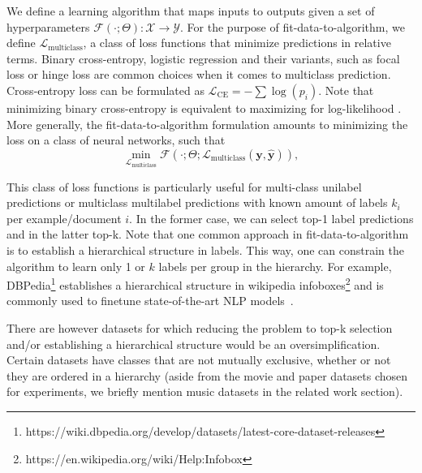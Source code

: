 We define a learning algorithm that maps inputs to outputs given a set of hyperparameters \(\mathcal{F}(\cdot ; \Theta): \mathcal{X} \rightarrow \mathcal{Y}\). For the purpose of fit-data-to-algorithm,
we define \(\mathcal{L}_{\text {multiclass}}\), a class of loss functions that
minimize predictions in relative terms. Binary cross-entropy, logistic regression and their
variants, such as focal loss or hinge loss are common choices when it comes to
multiclass prediction. Cross-entropy loss can be formulated as
\(\mathcal{L}_{\text {CE}}=-\sum \log \left(p_{i}\right)\). Note that
minimizing binary cross-entropy is equivalent to maximizing for log-likelihood
\cite[Section 4.3.4]{Bishop}. More generally, the fit-data-to-algorithm formulation amounts to minimizing the loss on a class of neural networks, such that
%
\begin{equation}
\underset{\mathcal{L}_{\text {multiclass}}} {\min} \mathcal{F}\left(\cdot ;
\Theta; \mathcal{L}_{\text {multiclass}} (\mathbf{y}, \hat{\mathbf{y}})
\right),
\end{equation}
%

This class of loss functions is particularly useful for multi-class unilabel predictions or multiclass multilabel predictions with known amount of labels $k_i$ per example/document $i$. In the former case,  we can select top-1 label predictions and in the latter top-k. Note that one common approach in fit-data-to-algorithm is to establish a hierarchical structure in labels. This way, one can constrain the algorithm to learn only 1 or $k$ labels per group in the hierarchy. For example, DBPedia\footnote{https://wiki.dbpedia.org/develop/datasets/latest-core-dataset-releases} establishes a hierarchical structure in wikipedia infoboxes\footnote{https://en.wikipedia.org/wiki/Help:Infobox} and is commonly used to finetune state-of-the-art NLP models~\citep[see, e.g.,][]{XLNet, ULMFit}.

There are however datasets for which reducing the problem to top-k selection and/or establishing a hierarchical structure would be an oversimplification. Certain datasets have classes that are not mutually exclusive, whether or not they are ordered in a hierarchy (aside from the movie and paper datasets chosen for experiments, we briefly mention music datasets in the related work section). 

